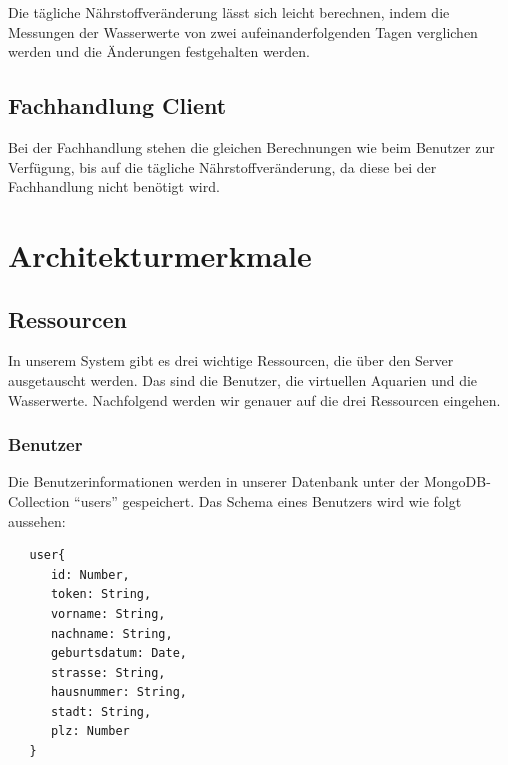 Die tägliche Nährstoffveränderung lässt sich leicht berechnen, indem die Messungen der Wasserwerte von zwei aufeinanderfolgenden Tagen verglichen werden und die Änderungen festgehalten werden.

\subsection{Fachhandlung Client}

Bei der Fachhandlung stehen die gleichen Berechnungen wie beim Benutzer zur Verfügung, bis auf die tägliche Nährstoffveränderung, da diese bei der Fachhandlung nicht benötigt wird.


\section{Architekturmerkmale}

\subsection{Ressourcen}

In unserem System gibt es drei wichtige Ressourcen, die über den Server ausgetauscht werden. Das sind die Benutzer, die virtuellen Aquarien und die Wasserwerte. Nachfolgend werden wir genauer auf die drei Ressourcen eingehen.

\subsubsection{Benutzer}

Die Benutzerinformationen werden in unserer Datenbank unter der MongoDB-Collection ``users'' gespeichert. Das Schema eines Benutzers wird wie folgt aussehen:

\begin{lstlisting}
   user{
      id: Number,
      token: String,
      vorname: String,
      nachname: String,
      geburtsdatum: Date,
      strasse: String,
      hausnummer: String,
      stadt: String,
      plz: Number
   }
\end{lstlisting}
 
